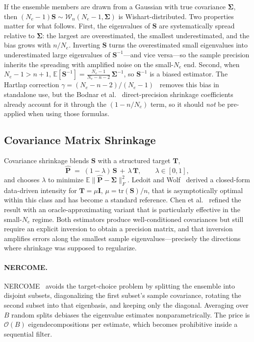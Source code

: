 If the ensemble members are drawn from a Gaussian with true covariance $\boldsymbol{\Sigma}$, then $(N_e - 1)\mathbf{S} \sim \mathcal{W}_n(N_e - 1, \boldsymbol{\Sigma})$ is Wishart-distributed. Two properties matter for what follows. First, the eigenvalues of $\mathbf{S}$ are systematically spread relative to $\boldsymbol{\Sigma}$: the largest are overestimated, the smallest underestimated, and the bias grows with $n/N_e$. Inverting $\mathbf{S}$ turns the overestimated small eigenvalues into underestimated large eigenvalues of $\mathbf{S}^{-1}$---and vice versa---so the sample precision inherits the spreading with amplified noise on the small-$N_e$ end. Second, when $N_e - 1 > n + 1$, $\mathbb{E}[\mathbf{S}^{-1}] = \frac{N_e-1}{N_e-n-2}\,\boldsymbol{\Sigma}^{-1}$, so $\mathbf{S}^{-1}$ is a biased estimator. The Hartlap correction $\gamma = (N_e - n - 2)/(N_e - 1)$~\cite{hartlap2007your} removes this bias in standalone use, but the Bodnar et al.~\cite{bodnar2016direct} direct-precision shrinkage coefficients already account for it through the $(1 - n/N_e)$ term, so it should \emph{not} be pre-applied when using those formulas.

\subsection{Covariance Matrix Shrinkage}
\label{sec:cov_estimation}

Covariance shrinkage blends $\mathbf{S}$ with a structured target $\mathbf{T}$,
\begin{equation}
\label{eq:shrinkage_cov}
\hat{\mathbf{P}} \;=\; (1 - \lambda)\,\mathbf{S} \,+\, \lambda\,\mathbf{T}, \qquad \lambda \in [0,1],
\end{equation}
and chooses $\lambda$ to minimize $\mathbb{E}\|\hat{\mathbf{P}} - \boldsymbol{\Sigma}\|_F^2$. Ledoit and Wolf~\cite{ledoit2004well} derived a closed-form data-driven intensity for $\mathbf{T} = \mu\mathbf{I}$, $\mu = \mathrm{tr}(\mathbf{S})/n$, that is asymptotically optimal within this class and has become a standard reference. Chen et al.~\cite{chen2010shrinkage} refined the result with an oracle-approximating variant that is particularly effective in the small-$N_e$ regime. Both estimators produce well-conditioned covariances but still require an explicit inversion to obtain a precision matrix, and that inversion amplifies errors along the smallest sample eigenvalues---precisely the directions where shrinkage was supposed to regularize.

\paragraph{NERCOME.}
NERCOME~\cite{lam2016nonparametric,joachimi2017non} avoids the target-choice problem by splitting the ensemble into disjoint subsets, diagonalizing the first subset's sample covariance, rotating the second subset into that eigenbasis, and keeping only the diagonal. Averaging over $B$ random splits debiases the eigenvalue estimates nonparametrically. The price is $\mathcal{O}(B)$ eigendecompositions per estimate, which becomes prohibitive inside a sequential filter.


